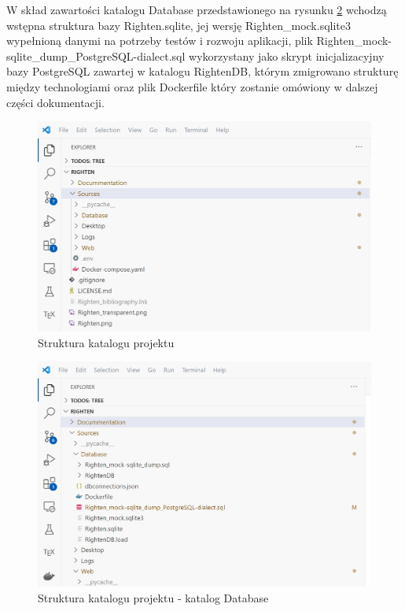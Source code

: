 \documentclass[a4paper, 10pt, twoside, openright]{report}
\begin{document}
\begin{large}
{W skład zawartości katalogu Database przedstawionego na rysunku 
\ref*{fig:projectdirectorydb}  wchodzą wstępna struktura bazy Righten.sqlite, 
jej wersję Righten\_mock.sqlite3 wypełnioną danymi na potrzeby testów i rozwoju 
aplikacji, plik Righten\_mock-sqlite\_dump\_PostgreSQL-dialect.sql wykorzystany 
jako skrypt inicjalizacyjny bazy PostgreSQL zawartej w katalogu RightenDB, 
którym zmigrowano strukturę między technologiami oraz plik Dockerfile który 
zostanie omówiony w dalszej części dokumentacji.}

\begin{figure}[H]           %
    \centering
    \includegraphics[width=12cm]{figures/Righten_project_directory_top.png}
    \caption{Struktura katalogu projektu}
    \label{fig:projectdirectorytop}
\end{figure}

\begin{figure}[H]           %
    \centering
    \includegraphics[width=12cm]{figures/Righten_project_directory_sources_Database.png}
    \caption{Struktura katalogu projektu - katalog Database}
    \label{fig:projectdirectorydb}
\end{figure}


\end{large}
\end{document}
